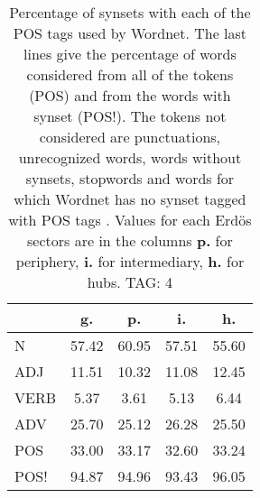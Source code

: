 \begin{table}[h!]
\begin{center}
\begin{tabular}{| l | c | c | c | c |}\hline
 & g. & p. & i. & h. \\\hline
N & 57.42  & 60.95  & 57.51  & 55.60 \\\hline
ADJ & 11.51  & 10.32  & 11.08  & 12.45 \\\hline
VERB & 5.37  & 3.61  & 5.13  & 6.44 \\\hline
ADV & 25.70  & 25.12  & 26.28  & 25.50 \\\hline
POS & 33.00  & 33.17  & 32.60  & 33.24 \\\hline
POS! & 94.87  & 94.96  & 93.43  & 96.05 \\\hline
\end{tabular}
\caption{Percentage of synsets with each of the POS tags used by Wordnet. The last lines give the percentage of words considered from all of the tokens (POS) and from the words with synset (POS!). The tokens not considered are punctuations, unrecognized words, words without synsets, stopwords and words for which Wordnet has no synset  tagged with POS tags . Values for each Erd\"os sectors are in the columns {{\bf p.}} for periphery, {{\bf i.}} for intermediary, {{\bf h.}} for hubs. TAG: 4}
\end{center}
\end{table}